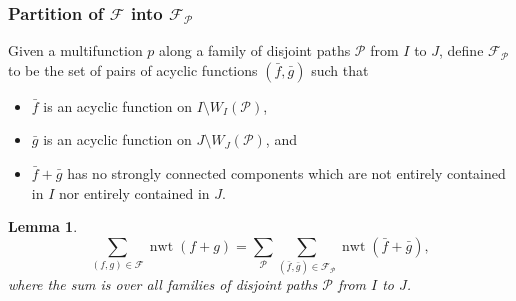 \documentclass[11pt]{article}
\newtheorem{lemm}[theo]{Lemma}
\theoremstyle{definition}
\numberwithin{equation}{section}
\DeclareMathOperator{\normalizedweight}{nwt}
\begin{document}
\subsubsection{Partition of \texorpdfstring{\(\mathcal{F}\)}{F} into \texorpdfstring{\(\mathcal{F}_{\mathcal{P}}\)}{FP}}

Given a multifunction \(p\) along a family of disjoint paths \(\mathcal{P}\) from \(I\) to \(J\),
define \(\mathcal{F}_{\mathcal{P}}\) to be the set of pairs of acyclic functions \((\bar{f}, \bar{g})\) such that
\begin{itemize}
    \item \(\bar{f}\) is an acyclic function on \(I \setminus W_I(\mathcal{P})\),
    \item \(\bar{g}\) is an acyclic function on \(J \setminus W_J(\mathcal{P})\), and
    \item \(\bar{f} + \bar{g}\) has no strongly connected components which are not entirely contained in \(I\) nor entirely contained in \(J\).
\end{itemize}

\begin{lemm} \label{lemma:partition-f-fp}
    \begin{equation*}
        \sum_{(f,g)\in\mathcal{F}} \normalizedweight(f+g)
        = \sum_{\mathcal{P}} \sum_{(\bar{f}, \bar{g}) \in \mathcal{F}_{\mathcal{P}}}\normalizedweight(\bar{f} + \bar{g}),
    \end{equation*}
    where the sum is over all families of disjoint paths \(\mathcal{P}\) from \(I\) to \(J\).
\end{lemm}
\end{document}
